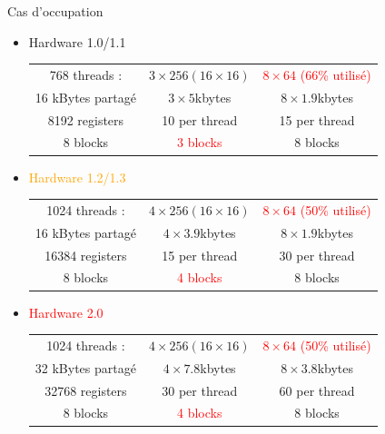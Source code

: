 \documentclass[handout,francais]{beamer}
\begin{document}
\begin{frame}{Cas d'occupation}

\begin{itemize} 
\item \textcolor{green!60!black}{Hardware 1.0/1.1}
  \begin{tabular}{c|c|c}\hline
  768 threads : & 
    \textcolor{green!60!black}{$3\times 256 (16\times 16)$} &
    \textcolor{red}{$8\times 64$ (66\% utilisé)}\\
  16 kBytes partagé &
    \textcolor{green!60!black}{$3\times 5$}kbytes &
    \textcolor{green!60!black}{$8\times 1.9$}kbytes \\
  8192 registers &
    \textcolor{green!60!black}{10 per thread} &
    \textcolor{green!60!black}{15 per thread} \\
  8 blocks & 
    \textcolor{red}{3 blocks} &
    \textcolor{green!60!black}{8 blocks} \\ \hline
  \end{tabular}
\item \textcolor{orange}{Hardware 1.2/1.3}
  \begin{tabular}{c|c|c}\hline
  1024 threads : & 
    \textcolor{green!60!black}{$4\times 256 (16\times 16)$} &
    \textcolor{red}{$8\times 64$ (50\% utilisé)}\\
  16 kBytes partagé &
    \textcolor{green!60!black}{$4\times 3.9$}kbytes &
    \textcolor{green!60!black}{$8\times 1.9$}kbytes \\
  16384 registers &
    \textcolor{green!60!black}{15 per thread} &
    \textcolor{green!60!black}{30 per thread} \\
  8 blocks & 
    \textcolor{red}{4 blocks} &
    \textcolor{green!60!black}{8 blocks} \\ \hline
  \end{tabular}
\item \textcolor{red}{Hardware 2.0}
  \begin{tabular}{c|c|c}\hline
  1024 threads : & 
    \textcolor{green!60!black}{$4\times 256 (16\times 16)$} &
    \textcolor{red}{$8\times 64$ (50\% utilisé)}\\
  32 kBytes partagé &
    \textcolor{green!60!black}{$4\times 7.8$}kbytes &
    \textcolor{green!60!black}{$8\times 3.8$}kbytes \\
  32768 registers &
    \textcolor{green!60!black}{30 per thread} &
    \textcolor{green!60!black}{60 per thread} \\
  8 blocks & 
    \textcolor{red}{4 blocks} &
    \textcolor{green!60!black}{8 blocks} \\ \hline
  \end{tabular}\end{itemize}
\end{frame}
\end{document}
